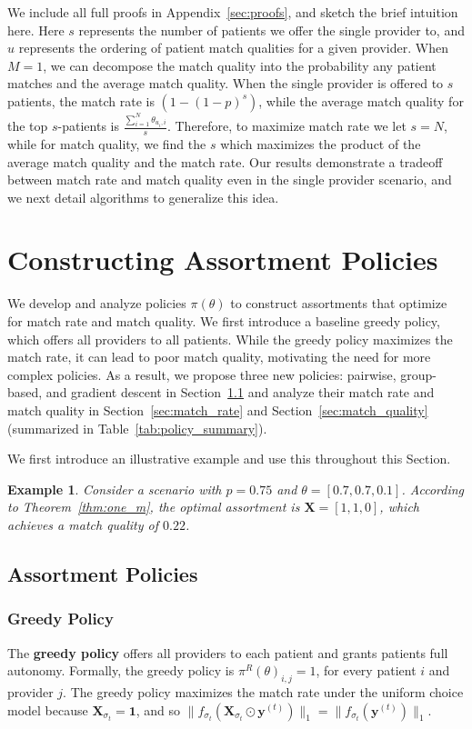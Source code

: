 \documentclass[11pt]{article}
\newtheorem{example}{Example}[section]
\begin{document}
We include all full proofs in Appendix~\ref{sec:proofs}, and sketch the brief intuition here. 
Here $s$ represents the number of patients we offer the single provider to, and $u$ represents the ordering of patient match qualities for a given provider. 
When $M=1$, we can decompose the match quality into the probability any patient matches and the average match quality.
When the single provider is offered to $s$ patients, the match rate is $ (1-(1-p)^{s})$, while the average match quality for the top $s$-patients is $\frac{\sum_{i=1}^{N} \theta_{u_{i},i}}{s}$. 
Therefore, to maximize match rate we let $s=N$, while for match quality, we find the $s$ which maximizes the product of the average match quality and the match rate. 
Our results demonstrate a tradeoff between match rate and match quality even in the single provider scenario, and we next detail algorithms to generalize this idea. 

\section{Constructing Assortment Policies}
\label{sec:policies}
We develop and analyze policies $\pi(\theta)$ to construct assortments that optimize for match rate and match quality. 
We first introduce a baseline greedy policy, which offers all providers to all patients. 
While the greedy policy maximizes the match rate, it can lead to poor match quality, motivating the need for more complex policies. 
As a result, we propose three new policies: pairwise, group-based, and gradient descent in Section~\ref{sec:introduce_policies} and analyze their match rate and match quality in Section~\ref{sec:match_rate} and Section~\ref{sec:match_quality} (summarized in Table~\ref{tab:policy_summary}).

We first introduce an illustrative example and use this throughout this Section. 
\begin{example}
    \label{ex:illustration}
    Consider a scenario with $p=0.75$ and $\theta = [0.7,0.7,0.1]$. 
    According to Theorem~\ref{thm:one_m}, the optimal assortment is $\mathbf{X} = [1,1,0]$, which achieves a match quality of $0.22$. 
\end{example}


\subsection{Assortment Policies}
\label{sec:introduce_policies}
\subsubsection{Greedy Policy}
\label{sec:greedy}
The \textbf{greedy policy} offers all providers to each patient and grants patients full autonomy. 
Formally, the greedy policy is $\pi^{R}(\theta)_{i,j} = 1$, for every patient $i$ and provider $j$. 
The greedy policy maximizes the match rate under the uniform choice model because $\mathbf{X}_{\sigma_{t}} = \mathbf{1}$, and so $\lVert f_{\sigma_{t}}(\mathbf{X}_{\sigma_{t}} \odot \mathbf{y}^{(t)})\rVert_{1} = \lVert f_{\sigma_{t}}(\mathbf{y}^{(t)}) \rVert_{1}$.
\end{document}
